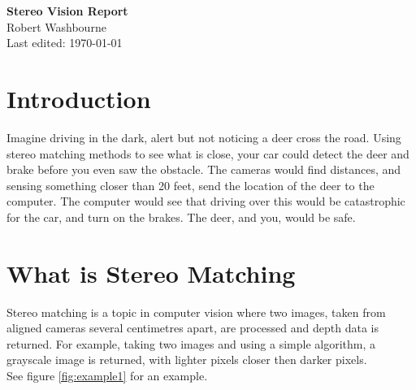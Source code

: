 \documentclass[11pt,fleqn]{article}
\begin{document}
\begin{center}
\Large{\textbf{Stereo Vision Report}}\\[5pt]
\large{Robert Washbourne}\\
Last edited: \today
\end{center}

\tableofcontents

\section{Introduction}

Imagine driving in the dark, alert but not noticing a deer cross the road. Using stereo matching methods to see what is close, your car could detect the deer and brake before you even saw the obstacle. The cameras would find distances, and sensing something closer than 20 feet, send the location of the deer to the computer. The computer would see that driving over this would be catastrophic for the car, and turn on the brakes. The deer, and you, would be safe.

\section{What is Stereo Matching}

Stereo matching is a topic in computer vision where two images, taken from aligned cameras several centimetres apart, are processed and depth data is returned. For example, taking two images and using a simple algorithm, a grayscale image is returned, with lighter pixels closer then darker pixels.\\[6pt]
%
See figure \ref{fig:example1} for an example.


\end{document}
